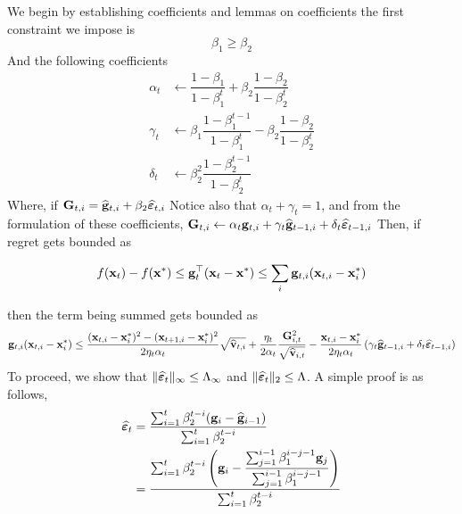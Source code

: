 We begin by establishing coefficients and lemmas on coefficients
the first constraint we impose is
\[
\beta_1\geq\beta_2
\]
And the following coefficients
\begin{align}
    \alpha_t&\gets\dfrac{1-\beta_1}{1-\beta_1^t}+\beta_2\dfrac{1-\beta_2}{1-\beta_2^t}\\
    \gamma_t&\gets\beta_1\dfrac{1-\beta_1^{t-1}}{1-\beta_1^t}-\beta_2\dfrac{1-\beta_2}{1-\beta_2^t}\\
    \delta_t&\gets\beta_2^2\dfrac{1-\beta_2^{t-1}}{1-\beta_2^t}
\end{align}
Where, if $\mathbf{G}_{t,i}=\widehat{\mathbf{g}}_{t,i}+\beta_2\widehat{\bm{\varepsilon}}_{t,i}$
Notice also that $\alpha_t+\gamma_t=1$, and from the formulation of these coefficients, $\mathbf{G}_{t,i}\gets\alpha_t\mathbf{g}_{t,i}+\gamma_t\widehat{\mathbf{g}}_{t-1,i}+\delta_{t}\widehat{\bm{\varepsilon}}_{t-1,i}$
Then, if regret gets bounded as

\[
f(\mathbf{x}_t)-f(\mathbf{x}^*)\leq \mathbf{g}_t^\top(\mathbf{x}_t-\mathbf{x}^*)\leq\sum_{i}\mathbf{g}_{t,i}(\mathbf{x}_{t,i}-\mathbf{x}^*_i)
\]

then the term being summed gets bounded as 
\begin{align*}
\mathbf{g}_{t,i}(\mathbf{x}_{t,i}-\mathbf{x}_i^*)\leq\dfrac{(\mathbf{x}_{t,i}-\mathbf{x}_i^*)^2-(\mathbf{x}_{t+1,i}-\mathbf{x}_i^*)^2}{2\eta_t\alpha_t}\sqrt{\widehat{\mathbf{v}}_{t,i}}+\dfrac{\eta_t}{2\alpha_t}\dfrac{\mathbf{G}_{i,t}^2}{\sqrt{\widehat{\mathbf{v}}_{i,t}}}-\dfrac{\mathbf{x}_{t,i}-\mathbf{x}_i^*}{2\eta_t\alpha_t}\left({\gamma_t\widehat{\mathbf{g}}_{t-1,i}+\delta_t\widehat{\bm{\varepsilon}}_{t-1,i}}\right)
\end{align*}
To proceed, we show that $\|\widehat{\bm{\varepsilon}}_t\|_\infty\leq\Lambda_\infty$ and $\|\widehat{\bm{\varepsilon}}_t\|_2\leq\Lambda$.
A simple proof is as follows, 
\begin{align*}
\widehat{\bm{\varepsilon}}_t&=\dfrac{\sum_{i=1}^{t}\beta_2^{t-i}(\mathbf{g}_i-\widehat{\mathbf{g}}_{i-1})}{\sum_{i=1}^{t}\beta_2^{t-i}}\\
&=\dfrac{\sum_{i=1}^{t}\beta_2^{t-i}\left(\mathbf{g}_i-\dfrac{\sum_{j=1}^{i-1}\beta_1^{i-j-1}\mathbf{g}_{j}}{\sum_{j=1}^{i-1}\beta_1^{i-j-1}}\right)}{\sum_{i=1}^{t}\beta_2^{t-i}}
\end{align*}
